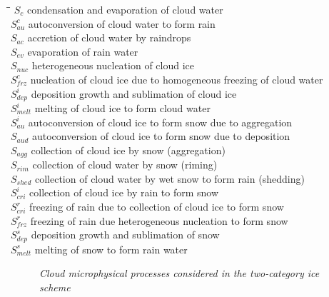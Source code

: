 \begin{tabbing}
\hspace*{0.5cm}\=\hspace{1.5cm}\= \kill
\> $S_c $ \> condensation and evaporation of cloud water\\
\> $S_{au}^c$ \> autoconversion of cloud water to form rain \\
\> $S_{ac}$ \> accretion of cloud water by raindrops \\
\> $S_{ev}$ \> evaporation of rain water \\
\> $S_{nuc}$ \> heterogeneous nucleation of cloud ice \\
\> $S_{frz}^c$ \> nucleation of cloud ice due to homogeneous freezing of
cloud water\\
\> $S_{dep}^i$ \> deposition growth and sublimation of cloud ice\\
\> $S_{melt}^i$ \> melting of cloud ice to form cloud water\\
\> $S_{au}^i$ \> autoconversion of cloud ice to form snow due to aggregation\\
\> $S_{aud}$ \> autoconversion of cloud ice to form snow due to deposition\\
\> $S_{agg}$ \> collection of cloud ice by snow (aggregation)\\
\> $S_{rim}$ \> collection of cloud water by snow (riming)\\
\> $S_{shed}$ \> collection of cloud water by wet snow to form rain (shedding)\\
\> $S_{cri}^i$ \> collection of cloud ice by rain to form snow\\
\> $S_{cri}^r$ \> freezing of rain due to collection of cloud ice to form snow\\
\> $S_{frz}^r$ \> freezing of rain due heterogeneous nucleation to form snow\\
\> $S_{dep}^s$ \> deposition growth and sublimation of snow\\
\> $S_{melt}^s$ \> melting of snow to form rain water\\
\end{tabbing}

\begin{figure}[t]
\centering
\epsfxsize 11cm
\centerline{}
\caption{\it Cloud microphysical processes considered in the two-category 
ice scheme} \label{icescheme}
\end{figure}

